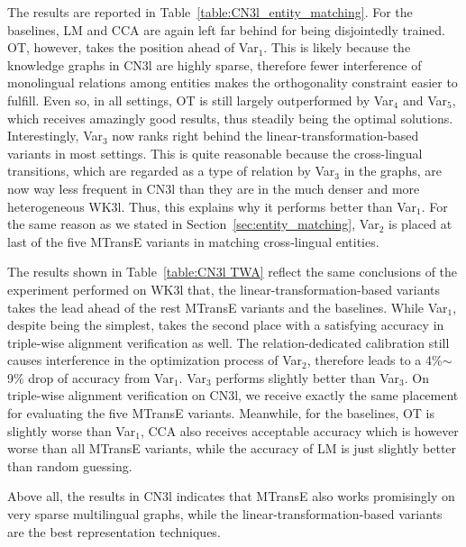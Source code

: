 \documentclass{article}
\begin{document}
 The results are reported in Table~\ref{table:CN3l_entity_matching}. For the baselines, LM and CCA are again left far behind for being disjointedly trained. OT, however, takes the position ahead of Var$_1$. This is likely because the knowledge graphs in CN3l are highly sparse, therefore fewer interference of monolingual relations among entities makes the orthogonality constraint easier to fulfill. Even so, in all settings, OT is still largely outperformed by Var$_4$ and Var$_5$, which receives amazingly good results, thus steadily being the optimal solutions. Interestingly, Var$_3$ now ranks right behind the linear-transformation-based variants in most settings. This is quite reasonable because the cross-lingual transitions, which are regarded as a type of relation by Var$_3$ in the graphs, are now way less frequent in CN3l than they are in the much denser and more heterogeneous WK3l. Thus, this explains why it performs better than Var$_1$. For the same reason as we stated in Section~\ref{sec:entity_matching}, Var$_2$ is placed at last of the five MTransE variants in matching cross-lingual entities.

  The results shown in Table~\ref{table:CN3l TWA} reflect the same conclusions of the experiment performed on WK3l that, the linear-transformation-based variants takes the lead ahead of the rest MTransE variants and the baselines. While Var$_1$, despite being the simplest, takes the second place with a satisfying accuracy in triple-wise alignment verification as well. The relation-dedicated calibration still causes interference in the optimization process of Var$_2$, therefore leads to a 4\%${\sim}$9\% drop of accuracy from Var$_1$. Var$_3$ performs slightly better than Var$_3$. On triple-wise alignment verification on CN3l, we receive exactly the same placement for evaluating the five MTransE variants. Meanwhile, for the baselines, OT is slightly worse than Var$_1$, CCA also receives acceptable accuracy which is however worse than all MTransE variants, while the accuracy of LM is just slightly better than random guessing.

\par
Above all, the results in CN3l indicates that MTransE also works promisingly on very sparse multilingual graphs, while the linear-transformation-based variants are the best representation techniques.
\end{document}
